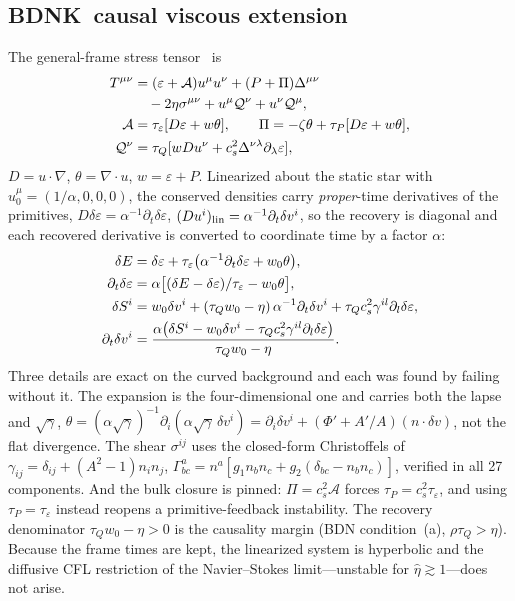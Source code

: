 \documentclass[aps,prd,reprint,amsmath,amssymb,nofootinbib,longbibliography,superscriptaddress]{revtex4-2}
\newcommand{\cs}{c_s}
\newcommand{\BDNK}{BDNK}
\newcommand{\de}{\delta\varepsilon}
\newcommand{\dS}{\delta S}
\newcommand{\dv}{\delta v}
\newcommand{\sg}{\sqrt{\gamma}}
\begin{document}
\subsection{\BDNK\ causal viscous extension}
\label{sec:bdnkmodel}
The general-frame stress tensor~\cite{BDN2022} is
\begin{align}
T^{\mu\nu} &= (\varepsilon+\mathcal A)u^\mu u^\nu + (P+\Pi)\Delta^{\mu\nu}\notag\\
 &\quad - 2\eta\sigma^{\mu\nu} + u^\mu\mathcal Q^\nu + u^\nu\mathcal Q^\mu,\notag\\
\mathcal A &= \tau_\varepsilon[D\varepsilon + w\theta],\qquad
\Pi = -\zeta\theta + \tau_P[D\varepsilon + w\theta],\notag\\
\mathcal Q^\nu &= \tau_Q[wDu^\nu + \cs^2\Delta^{\nu\lambda}\partial_\lambda\varepsilon],
\label{eq:bdnk}
\end{align}
$D = u\cdot\nabla$, $\theta = \nabla\cdot u$, $w = \varepsilon+P$. Linearized about the static
star with $u^\mu_0 = (1/\alpha,0,0,0)$, the conserved densities carry \emph{proper}-time
derivatives of the primitives, $D\de = \alpha^{-1}\partial_t\de$, $(Du^i)_{\rm lin} =
\alpha^{-1}\partial_t\dv^i$, so the recovery is diagonal and each recovered derivative is
converted to coordinate time by a factor $\alpha$:
\begin{align}
\delta E &= \de + \tau_\varepsilon\big(\alpha^{-1}\partial_t\de + w_0\theta\big),\notag\\
\partial_t\de &= \alpha\big[(\delta E-\de)/\tau_\varepsilon - w_0\theta\big],
\label{eq:recE}\\
\dS^i &= w_0\dv^i + (\tau_Qw_0-\eta)\,\alpha^{-1}\partial_t\dv^i + \tau_Q\cs^2\gamma^{il}\partial_l\de,\notag\\
\partial_t\dv^i &= \frac{\alpha\big(\dS^i - w_0\dv^i - \tau_Q\cs^2\gamma^{il}\partial_l\de\big)}{\tau_Qw_0-\eta}.
\label{eq:recS}
\end{align}
Three details are exact on the curved background and each was found by failing without it. The
expansion is the four-dimensional one and carries both the lapse and $\sg$,
$\theta = (\alpha\sg)^{-1}\partial_i(\alpha\sg\,\dv^i) = \partial_i\dv^i + (\Phi'+A'/A)(n\cdot\dv)$,
not the flat divergence. The shear $\sigma^{ij}$ uses the closed-form Christoffels of
$\gamma_{ij} = \delta_{ij}+(A^2-1)n_in_j$, $\Gamma^a_{bc} = n^a[g_1n_bn_c + g_2(\delta_{bc}-n_bn_c)]$,
verified in all 27 components. And the bulk closure is pinned: $\Pi = \cs^2\mathcal A$ forces
$\tau_P = \cs^2\tau_\varepsilon$, and using $\tau_P = \tau_\varepsilon$ instead reopens a
primitive-feedback instability. The recovery denominator $\tau_Qw_0-\eta > 0$ is the
causality margin (BDN condition~(a), $\rho\tau_Q > \eta$). Because the frame times are kept,
the linearized system is hyperbolic and the diffusive CFL restriction of the Navier--Stokes
limit---unstable for $\hat\eta\gtrsim1$---does not arise.
\end{document}
